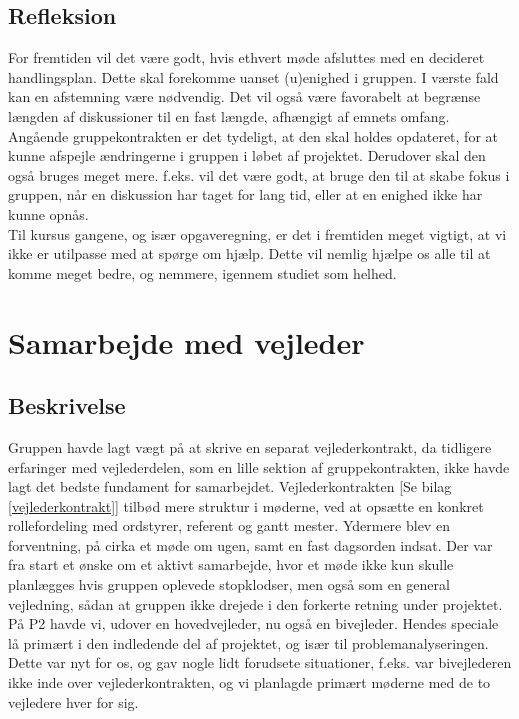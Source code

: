 \documentclass[11pt]{article}
\begin{document}
\subsection{Refleksion}
For fremtiden vil det være godt, hvis ethvert møde afsluttes med en decideret handlingsplan. Dette skal forekomme uanset (u)enighed i gruppen. I værste fald kan en afstemning være nødvendig. Det vil også være favorabelt at begrænse længden af diskussioner til en fast længde, afhængigt af emnets omfang.\\ 
Angående gruppekontrakten er det tydeligt, at den skal holdes opdateret, for at kunne afspejle ændringerne i gruppen i løbet af projektet. Derudover skal den også bruges meget mere. f.eks. vil det være godt, at bruge den til at skabe fokus i gruppen, når en diskussion har taget for lang tid, eller at en enighed ikke har kunne opnås.\\
Til kursus gangene, og især opgaveregning, er det i fremtiden meget vigtigt, at vi ikke er utilpasse med at spørge om hjælp. Dette vil nemlig hjælpe os alle til at komme meget bedre, og nemmere, igennem studiet som helhed. 

\section{Samarbejde med vejleder}
\subsection{Beskrivelse}
Gruppen havde lagt vægt på at skrive en separat vejlederkontrakt, da tidligere erfaringer med vejlederdelen, som en lille sektion af gruppekontrakten, ikke havde lagt det bedste fundament for samarbejdet. Vejlederkontrakten [Se bilag \ref{vejlederkontrakt}] tilbød mere struktur i møderne, ved at opsætte en konkret rollefordeling med ordstyrer, referent og gantt mester. Ydermere blev en forventning, på cirka et møde om ugen, samt en fast dagsorden indsat. Der var fra start et ønske om et aktivt samarbejde, hvor et møde ikke kun skulle planlægges hvis gruppen oplevede stopklodser, men også som en general vejledning, sådan at gruppen ikke drejede i den forkerte retning under projektet.\\
På P2 havde vi, udover en hovedvejleder, nu også en bivejleder. Hendes speciale lå primært i den indledende del af projektet, og især til problemanalyseringen. Dette var nyt for os, og gav nogle lidt forudsete situationer, f.eks. var bivejlederen ikke inde over vejlederkontrakten, og vi planlagde primært møderne med de to vejledere hver for sig. 
\end{document}
